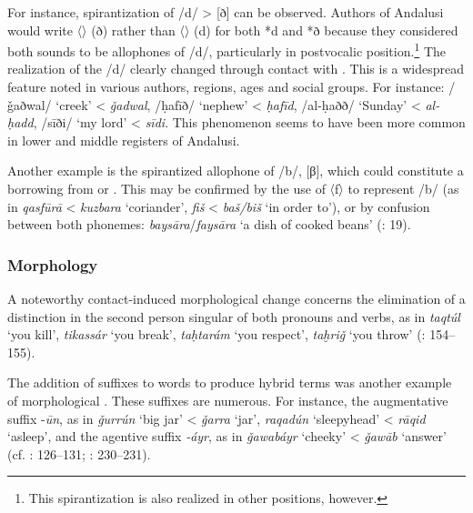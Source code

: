 \documentclass[output=paper,modfonts,nonflat]{langsci/langscibook}
\begin{document}
For instance, spirantization of /d/ > [ð] can be observed. Authors of Andalusi  would write 〈{}〉 (ð) rather than 〈{}〉 (d) for both *d and *ð because they considered both sounds to be allophones of /d/, particularly in postvocalic position.\footnote{This spirantization is also realized in other positions, however.}  The realization of the /d/  clearly changed through contact with . This is a widespread feature noted in various authors, regions, ages and social groups. For instance: {} /ǧaðwal/ ‘creek’ < \textit{ǧadwal}, {} /ḥafīð/ ‘nephew’ < \textit{ḥafīd}, {} /al-ḥaðð/ ‘Sunday’ < \textit{al-ḥadd}, {} /sīði/ ‘my lord’ < \textit{sīdi}. This phenomenon seems to have been more common in lower and middle registers of Andalusi. 

Another example is the spirantized allophone of /b/, [β], which could constitute a borrowing from  or  . This may be confirmed by the use of 〈f〉 to represent /b/ (as in {}  \textit{qasfūrā} < \textit{kuzbara} ‘coriander’, {}  \textit{fiš} < \textit{baš/biš} ‘in order to’), or by confusion between both phonemes: \textit{baysāra}/\textit{faysāra} ‘a dish of cooked beans’ (\citealt{CorrientePereiraVicente2015}: 19).
 

\subsubsection{Morphology}

A noteworthy contact-induced morphological change concerns the elimination of a  distinction in the second person singular of both pronouns and verbs, as in \textit{taqtúl} ‘you kill’, \textit{tikassár} ‘you break’, \textit{taḥtarám} ‘you respect’, \textit{taḫriǧ} ‘you throw’ (\citealt{CorrientePereiraVicente2015}: 154–155).

The addition of  suffixes to  words to produce hybrid terms was another example of morphological . These suffixes are numerous. For instance, the augmentative suffix -\textit{ūn}, as in \textit{ǧurrún} ‘big jar’ < \textit{ǧarra} ‘jar’, \textit{raqadún} ‘sleepyhead’ < \textit{rāqid} ‘asleep’, and the agentive suffix \textit{-áyr}, as in \textit{ǧawabáyr} ‘cheeky’ < \textit{ǧawāb} `answer' (cf. \citealt{Corriente1992book}: 126–131; \citealt{CorrientePereiraVicente2015}: 230–231). 
\end{document}
